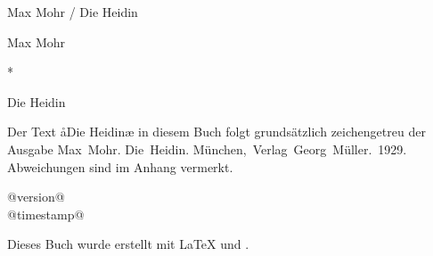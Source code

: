 
\begin{titlepage}
\pagestyle{empty}

\begin{center}

Max Mohr / Die Heidin

\cleardoublepage

\null

\vspace{4ex}

\huge
Max Mohr

\vspace{3ex}
*
\vspace{2ex}

\Huge
Die Heidin

\vspace{4ex}


\clearpage

\null

\vfill

\normalfont\small

\begin{center}
Der Text \aa{}Die Heidin\ae{} in diesem Buch folgt
grundsätzlich zeichengetreu der Ausgabe\dopp{} \mbox{Max Mohr.} \mbox{Die Heidin.}
\mbox{München, Verlag Georg Müller. 1929.}
Abweichungen sind im Anhang vermerkt.
\end{center}

\begin{center}
@version@\\
@timestamp@
\end{center}

Dieses Buch wurde erstellt mit \LaTeX{} und \KOMAScript{}.

\end{center}

\end{titlepage}

